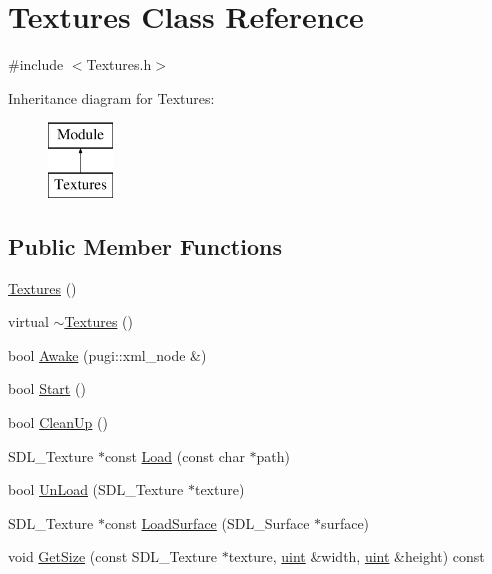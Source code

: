 \hypertarget{class_textures}{}\section{Textures Class Reference}
\label{class_textures}


{\ttfamily \#include $<$Textures.\+h$>$}

Inheritance diagram for Textures\+:\begin{figure}[H]
\begin{center}
\leavevmode
\includegraphics[height=2.000000cm]{class_textures}
\end{center}
\end{figure}
\subsection*{Public Member Functions}
\begin{DoxyCompactItemize}
\item 
\mbox{\hyperlink{class_textures_a43eceaf4fb6fa052e1c41cebb7b18189}{Textures}} ()
\item 
virtual \mbox{\hyperlink{class_textures_aa1480566dae8b3a6de5e6c98d9fdc225}{$\sim$\+Textures}} ()
\item 
bool \mbox{\hyperlink{class_textures_a3956f023ff27addfed10285805ee7f61}{Awake}} (pugi\+::xml\+\_\+node \&)
\item 
bool \mbox{\hyperlink{class_textures_a15ed80517d40c16e670a9d968ce0944e}{Start}} ()
\item 
bool \mbox{\hyperlink{class_textures_ae1e354e40c2ead6427152e70b92ad43e}{Clean\+Up}} ()
\item 
S\+D\+L\+\_\+\+Texture $\ast$const \mbox{\hyperlink{class_textures_a97f7d4971861a4b24b9756d6f85c0424}{Load}} (const char $\ast$path)
\item 
bool \mbox{\hyperlink{class_textures_a97ee35678d1bae2eb558c993bc2dce34}{Un\+Load}} (S\+D\+L\+\_\+\+Texture $\ast$texture)
\item 
S\+D\+L\+\_\+\+Texture $\ast$const \mbox{\hyperlink{class_textures_ae0e82cc315fb823f23ae1b63c6da5a68}{Load\+Surface}} (S\+D\+L\+\_\+\+Surface $\ast$surface)
\item 
void \mbox{\hyperlink{class_textures_a3cac54c5bd4925d4527860ca0a816dab}{Get\+Size}} (const S\+D\+L\+\_\+\+Texture $\ast$texture, \mbox{\hyperlink{_defs_8h_a91ad9478d81a7aaf2593e8d9c3d06a14}{uint}} \&width, \mbox{\hyperlink{_defs_8h_a91ad9478d81a7aaf2593e8d9c3d06a14}{uint}} \&height) const
\end{DoxyCompactItemize}
